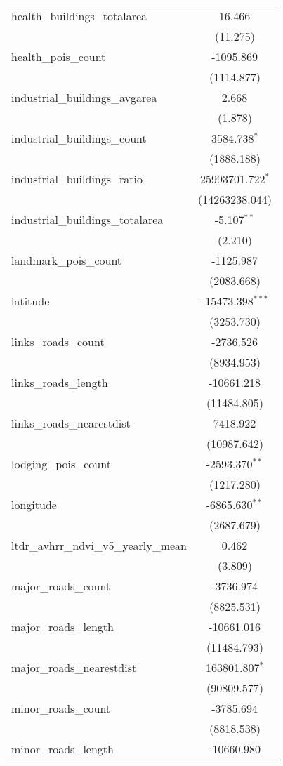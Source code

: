 \begin{table}[!htbp]
\begin{tabular}{@{\extracolsep{5pt}}lc}
 health_buildings_totalarea & 16.466$^{}$ \\
  & (11.275) \\
 health_pois_count & -1095.869$^{}$ \\
  & (1114.877) \\
 industrial_buildings_avgarea & 2.668$^{}$ \\
  & (1.878) \\
 industrial_buildings_count & 3584.738$^{*}$ \\
  & (1888.188) \\
 industrial_buildings_ratio & 25993701.722$^{*}$ \\
  & (14263238.044) \\
 industrial_buildings_totalarea & -5.107$^{**}$ \\
  & (2.210) \\
 landmark_pois_count & -1125.987$^{}$ \\
  & (2083.668) \\
 latitude & -15473.398$^{***}$ \\
  & (3253.730) \\
 links_roads_count & -2736.526$^{}$ \\
  & (8934.953) \\
 links_roads_length & -10661.218$^{}$ \\
  & (11484.805) \\
 links_roads_nearestdist & 7418.922$^{}$ \\
  & (10987.642) \\
 lodging_pois_count & -2593.370$^{**}$ \\
  & (1217.280) \\
 longitude & -6865.630$^{**}$ \\
  & (2687.679) \\
 ltdr_avhrr_ndvi_v5_yearly_mean & 0.462$^{}$ \\
  & (3.809) \\
 major_roads_count & -3736.974$^{}$ \\
  & (8825.531) \\
 major_roads_length & -10661.016$^{}$ \\
  & (11484.793) \\
 major_roads_nearestdist & 163801.807$^{*}$ \\
  & (90809.577) \\
 minor_roads_count & -3785.694$^{}$ \\
  & (8818.538) \\
 minor_roads_length & -10660.980$^{}$ \\

\end{tabular}
\end{table}
